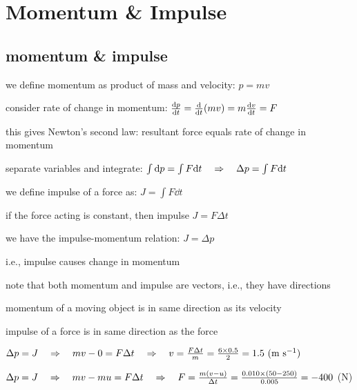 \section{Momentum \& Impulse}


\subsection{momentum \& impulse}

we define momentum as product of mass and velocity: $\boxed{p = mv}$

consider rate of change in momentum: $\frac{\mathrm{d} p}{\mathrm{d} t} = \frac{\mathrm{d}}{\mathrm{d}t} (mv) = m \frac{\mathrm{d}v}{\mathrm{d}t} = F $

this gives Newton's second law: resultant force equals rate of change in momentum

separate variables and integrate: $\int \mathrm{d} p = \int F \mathrm{d} t \quad \Rightarrow \quad \Delta p = \int F \mathrm{d} t$

we define impulse of a force as: $\boxed{J = \int F \dd t}$ 

if the force acting is constant, then impulse $J=F\Delta t$

we have the impulse-momentum relation: $\boxed{J = \Delta p}$

i.e., impulse causes change in momentum

\vspace*{\baselineskip}

note that both momentum and impulse are vectors, i.e., they have directions

momentum of a moving object is in same direction as its velocity

impulse of a force is in same direction as the force


{

\centering

$\Delta p = J \quad \Rightarrow \quad mv - 0 = F\Delta t \quad \Rightarrow \quad v=\frac{F\Delta t}{m} = \frac{6\times0.5}{2}=1.5 \text{ (m s$^{-1}$)} $

}


{
	
	\centering
	
	$\Delta p = J \quad \Rightarrow \quad mv - mu = F\Delta t \quad \Rightarrow \quad F = \frac{m(v-u)}{\Delta t} = \frac{0.010\times(50-250)}{0.005} = -400$ (N)
	
}


